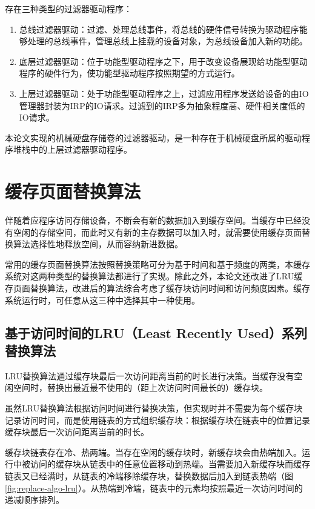 存在三种类型的过滤器驱动程序：

\begin{enumerate}
\item
总线过滤器驱动：过滤、处理总线事件，将总线的硬件信号转换为驱动程序能够处理的总线事件，管理总线上挂载的设备对象，为总线设备加入新的功能。
\item
底层过滤器驱动：位于功能型驱动程序之下，用于改变设备展现给功能型驱动程序的硬件行为，使功能型驱动程序按照期望的方式运行。
\item
上层过滤器驱动：处于功能型驱动程序之上，过滤应用程序发送给设备的由IO管理器封装为IRP的IO请求。过滤到的IRP多为抽象程度高、硬件相关度低的IO请求。
\end{enumerate}

本论文实现的机械硬盘存储卷的过滤器驱动，是一种存在于机械硬盘所属的驱动程序堆栈中的上层过滤器驱动程序。

\section{缓存页面替换算法}
\label{sec:cache_algorithm}

伴随着应程序访问存储设备，不断会有新的数据加入到缓存空间。当缓存中已经没有空闲的存储空间，而此时又有新的主存数据可以加入时，就需要使用缓存页面替换算法选择性地释放空间，从而容纳新进数据。

常用的缓存页面替换算法按照替换策略可分为基于时间和基于频度的两类，本缓存系统对这两种类型的替换算法都进行了实现。除此之外，本论文还改进了LRU缓存页面替换算法，改进后的算法综合考虑了缓存块访问时间和访问频度因素。缓存系统运行时，可任意从这三种中选择其中一种使用。

\subsection{基于访问时间的LRU（Least Recently Used）系列替换算法}

LRU替换算法\cite{LRU}通过缓存块最后一次访问距离当前的时长进行决策。当缓存没有空闲空间时，替换出最近最不使用的（距上次访问时间最长的）缓存块。

虽然LRU替换算法根据访问时间进行替换决策，但实现时并不需要为每个缓存块记录访问时间，而是使用链表的方式组织缓存块：根据缓存块在链表中的位置记录缓存块最后一次访问距离当前的时长。

缓存块链表存在冷、热两端。当存在空闲的缓存块时，新缓存块会由热端加入。运行中被访问的缓存块从链表中的任意位置移动到热端。当需要加入新缓存块而缓存链表又已经满时，从链表的冷端移除缓存块，替换数据后加入到链表热端（图\ref{fig:replace-algo-lru}）。从热端到冷端，链表中的元素均按照最近一次访问时间的递减顺序排列。

